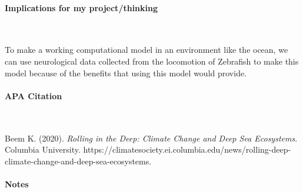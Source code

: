 \vspace*{-0.5cm}
\paragraph{Implications for my project/thinking} \

To make a working computational model in an environment like the ocean, we can use neurological data collected from the locomotion of Zebrafish to make this model because of the benefits that using this model would provide. 

\newpage 

\vspace*{-0.5cm}
\paragraph{APA Citation} \

\begin{hangparas}{.25in}{1}
Beem K. (2020). \textit{Rolling in the Deep: Climate Change and Deep Sea Ecosystems}. Columbia University. https://climatesociety.ei.columbia.edu/news/rolling-deep-climate-change-and-deep-sea-ecosystems.
\end{hangparas}

\vspace*{-0.5cm}
\paragraph{Notes} \

